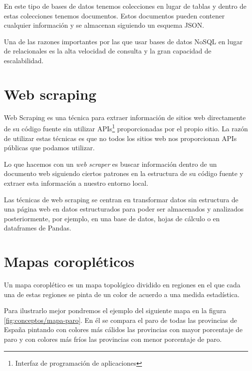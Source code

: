 En este tipo de bases de datos tenemos colecciones en lugar de tablas y dentro de estas colecciones tenemos documentos. Estos documentos pueden contener cualquier información y se almacenan siguiendo un esquema JSON.

Una de las razones importantes por las que usar bases de datos NoSQL en lugar de relacionales es la alta velocidad de consulta y la gran capacidad de escalabilidad.


\section{Web scraping} \label{webscraping}

Web Scraping \cite{wiki:webscraping} es una técnica para extraer información de sitios web directamente de su código fuente sin utilizar APIs\footnote{Interfaz de programación de aplicaciones} proporcionadas por el propio sitio. La razón de utilizar estas técnicas es que no todos los sitios web nos proporcionan APIs públicas que podamos utilizar.

Lo que hacemos con un \textit{web scraper} es buscar información dentro de un documento web siguiendo ciertos patrones en la estructura de su código fuente y extraer esta información a nuestro entorno local.

Las técnicas de web scraping se centran en transformar datos sin estructura de una página web en datos estructurados para poder ser almacenados y analizados posteriormente, por ejemplo, en una base de datos, hojas de cálculo o en dataframes de Pandas.


\section{Mapas coropléticos} \label{mapascoropleticos}

Un mapa coroplético \cite{wiki:mapascoropleticos} es un mapa topológico dividido en regiones en el que cada una de estas regiones se pinta de un color de acuerdo a una medida estadística.

Para ilustrarlo mejor pondremos el ejemplo del siguiente mapa en la figura \ref{fig:conceptos/mapa-paro}. En él se compara el paro de todas las provincias de España pintando con colores más cálidos las provincias con mayor porcentaje de paro y con colores más fríos las provincias con menor porcentaje de paro.


